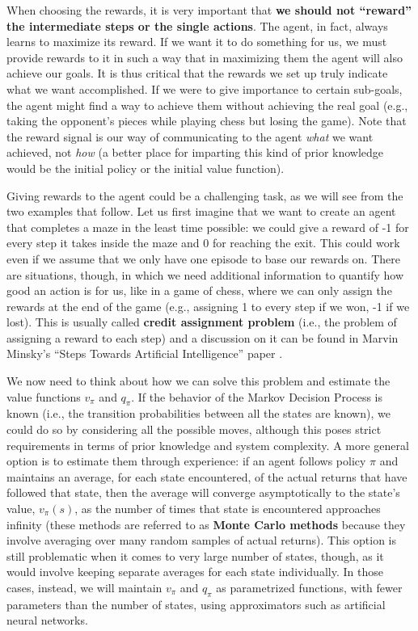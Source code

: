 When choosing the rewards, it is very important that \textbf{we should not ``reward'' the intermediate steps or the single actions}. The agent, in fact, always learns to maximize its reward. If we want it to do something for us, we must provide rewards to it in such a way that in maximizing them the agent will also achieve our goals. It is thus critical that the rewards we set up truly indicate what we want accomplished. If we were to give importance to certain sub-goals, the agent might find a way to achieve them without achieving the real goal (e.g., taking the opponent's pieces while playing chess but losing the game). Note that the reward signal is our way of communicating to the agent \textit{what} we want achieved, not \textit{how} (a better place for imparting this kind of prior knowledge would be the initial policy or the initial value function).

Giving rewards to the agent could be a challenging task, as we will see from the two examples that follow. Let us first imagine that we want to create an agent that completes a maze in the least time possible: we could give a reward of -1 for every step it takes inside the maze and 0 for reaching the exit. This could work even if we assume that we only have one episode to base our rewards on. There are situations, though, in which we need additional information to quantify how good an action is for us, like in a game of chess, where we can only assign the rewards at the end of the game (e.g., assigning 1 to every step if we won, -1 if we lost). This is usually called \textbf{credit assignment problem} (i.e., the problem of assigning a reward to each step) and a discussion on it can be found in Marvin Minsky’s ``Steps Towards Artificial Intelligence'' paper \cite{4066245}.

We now need to think about how we can solve this problem and estimate the value functions $v_\pi$ and $q_\pi$. If the behavior of the Markov Decision Process is known (i.e., the transition probabilities between all the states are known), we could do so by considering all the possible moves, although this poses strict requirements in terms of prior knowledge and system complexity. A more general option is to estimate them through experience: if an agent follows policy $\pi$ and maintains an average, for each state encountered, of the actual returns that have followed that state, then the average will converge asymptotically to the state’s value, $v_\pi(s)$, as the number of times that state is encountered approaches infinity (these methods are referred to as \textbf{Monte Carlo methods} because they involve averaging over many random samples of actual returns). This option is still problematic when it comes to very large number of states, though, as it would involve keeping separate averages for each state individually. In those cases, instead, we will maintain $v_\pi$ and $q_\pi$ as parametrized functions, with fewer parameters than the number of states, using approximators such as artificial neural networks.

